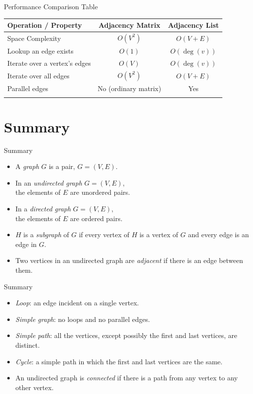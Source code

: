 \documentclass[14pt,aspectratio=1610]{beamer}
\begin{document}
\begin{frame}{Performance Comparison Table}
  \small%
  \begin{tabular}{lcc}
    \toprule{}%
    \textbf{Operation / Property} & \textbf{Adjacency Matrix} & \textbf{Adjacency List}\\%
    \midrule{}%
    Space Complexity& \(O(V^2)\) & \(O(V+E)\) \\
    \addlinespace%
    Lookup an edge exists & \(O(1)\) & \(O(\deg(v))\) \\
    \addlinespace%
    Iterate over a vertex's edges & \(O(V)\) & \(O(\deg(v))\) \\
    \addlinespace%
    Iterate over all edges & \(O(V^2)\) & \(O(V+E)\) \\
    \addlinespace%
    Parallel edges & No (ordinary matrix) & Yes \\
    \bottomrule{}%
  \end{tabular}
\end{frame}


\section{Summary}

\begin{frame}{Summary}
\begin{itemize}
  \item
    A \emph{graph} \(G\) is a pair, \(G = (V, E)\).
  \item
    In an \emph{undirected graph} \(G = (V, E)\),\\
    the elements of \(E\) are unordered pairs.
  \item
    In a \emph{directed graph} \(G = (V, E)\),\\
    the elements of \(E\) are ordered pairs.
  \item
    \(H\) is a \emph{subgraph} of \(G\) if every vertex of \(H\) is a vertex of \(G\) and every edge is an edge in \(G\).
  \item
    Two vertices in an undirected graph are \emph{adjacent} if there is an edge between them.
\end{itemize}
\end{frame}

\begin{frame}{Summary}
\begin{itemize}
  \item
    \emph{Loop}: an edge incident on a single vertex.
  \item
    \emph{Simple graph}: no loops and no parallel edges.
  \item
    \emph{Simple path}: all the vertices, except possibly the first and last vertices, are distinct.
  \item
    \emph{Cycle}: a simple path in which the first and last vertices are the same.
  \item
    An undirected graph is \emph{connected} if there is a path from any vertex to any other vertex.
\end{itemize}
\end{frame}
\end{document}
